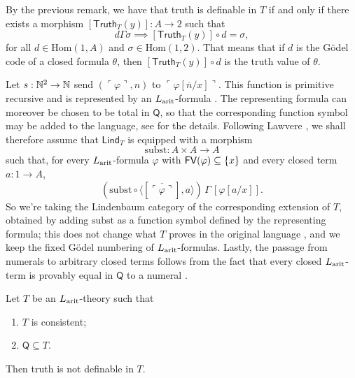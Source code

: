\begin{remark}
    By the previous remark, we have that truth is definable in $T$ if and only if there exists a morphism $[\mathsf{Truth}_T(y)]:A\to2$ such that
    \[ d\Gamma\sigma\implies[\mathsf{Truth}_T(y)]\circ d = \sigma, \]
    for all $d\in\mathrm{Hom}(1,A)$ and $\sigma\in\mathrm{Hom}(1,2)$.
    That means that if $d$ is the Gödel code of a closed formula $\theta$, then $[\mathsf{Truth}_T(y)]\circ d$ is the truth value of $\theta$.
\end{remark}

\begin{remark}[Substitution]
    Let $s:\mathbb{N}^2\to\mathbb{N}$ send $(\ulcorner\varphi\urcorner,n)$ to $\ulcorner\varphi[\overline{n}/x]\urcorner$. This function is primitive recursive \cite[Propositions~3.6 and~3.11, pp.~65, 67]{ZachIncompletenessComputability2026} and is represented by an $L_{\textnormal{arit}}$-formula \cite[Definition~4.1, p.~78, and Theorem~4.27, pp.~96--97]{ZachIncompletenessComputability2026}.
    The representing formula can moreover be chosen to be total in $\mathsf Q$, so that the corresponding function symbol may be added to the language, see \cite[\S~16.3, pp.~122--123, especially Theorem~16.4]{Smith2013} for the details. Following Lawvere \cite[pp.~143--144]{Lawvere1969}, we shall therefore assume that $\mathsf{Lind}_T$ is equipped with a morphism
    \[ \textrm{subst}:A\times A\to A \]
    such that, for every $L_{\textnormal{arit}}$-formula $\varphi$ with $\textsf{FV}(\varphi)\subseteq\{x\}$ and every closed term $a:1\to A$,
    \[ \left(\textrm{subst}\circ\langle[\overline{\ulcorner\varphi\urcorner}],a\rangle\right)\,\Gamma\,[\varphi[a/x]]. \]
    So we're taking the Lindenbaum category of the corresponding extension of $T$, obtained by adding $\textrm{subst}$ as a function symbol defined by the representing formula; this does not change what $T$ proves in the original language \cite[\S~16.3(a), p.~122]{Smith2013}, and we keep the fixed Gödel numbering of $L_{\textnormal{arit}}$-formulas.
    Lastly, the passage from numerals to arbitrary closed terms follows from the fact that every closed $L_{\textnormal{arit}}$-term is provably equal in $\mathsf Q$ to a numeral \cite[Lemma~4.34, pp.~100--101]{ZachIncompletenessComputability2026}.
\end{remark}

\begin{theorem}
    Let $T$ be an $L_{\textnormal{arit}}$-theory such that
    \begin{enumerate}[label=(\roman*)]
        \item $T$ is consistent;
        \item $\mathsf Q \subseteq T$.
    \end{enumerate}
    Then truth is not definable in $T$.
\end{theorem}

